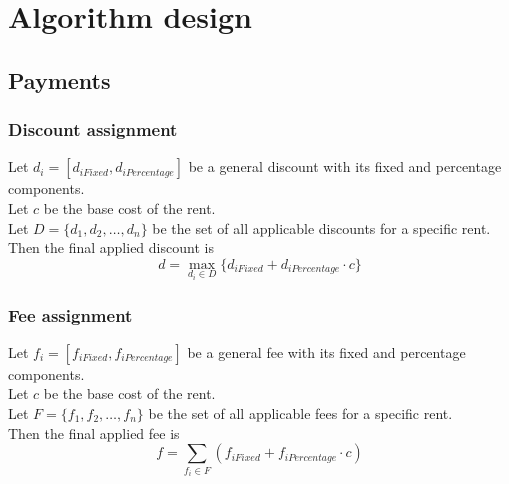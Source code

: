 \section{Algorithm design}
\subsection{Payments}
\subsubsection{Discount assignment}
Let $d_i=[d_{iFixed},d_{iPercentage}]$ be a general discount with its fixed and percentage components.\\
Let $c$ be the base cost of the rent.\\
Let $D = \lbrace d_1,d_2,\ldots,d_n\rbrace$ be the set of all applicable discounts for a specific rent.\\
Then the final applied discount is $$d = \max_{d_i\in D} \lbrace d_{iFixed}+d_{iPercentage}\cdot c \rbrace$$

\subsubsection{Fee assignment}
Let $f_i=[f_{iFixed},f_{iPercentage}]$ be a general fee with its fixed and percentage components.\\
Let $c$ be the base cost of the rent.\\
Let $F = \lbrace f_1,f_2,\ldots,f_n\rbrace$ be the set of all applicable fees for a specific rent.\\
Then the final applied fee is $$f = \sum_{f_i\in F} ( f_{iFixed} + f_{iPercentage} \cdot c )$$

